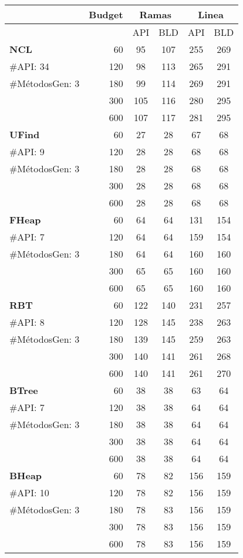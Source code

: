 \begin{table}[H]
{\scriptsize

\begin{tabular}{l |r |cc |cc }
\hline
&Budget&\multicolumn{2}{c|}{Ramas} &\multicolumn{2}{c|}{Linea} \\
\hline
   &   &API &BLD  &API &BLD   \\
\hline

\multirow{1}{*}{\textbf{NCL}}
& 60 & 95 & 107  & 255& 269  \\
{\scriptsize \#API: 34}& 120 & 98 & 113 & 265 &291 \\
{\scriptsize \#MétodosGen: 3}& 180 & 99& 114 & 269 & 291  \\
& 300 & 105 & 116  &280 & 295   \\
& 600 & 107 &  117 & 281&  295\\
\hline

\multirow{1}{*}{\textbf{UFind}} 
& 60 & 27 & 28  & 67& 68 \\
  {\scriptsize \#API: 9}& 120 & 28 & 28 & 68 &68 \\
  {\scriptsize \#MétodosGen: 3}& 180 & 28& 28 & 68 &68  \\
  & 300 & 28 & 28 &68 & 68  \\
& 600 & 28 &  28 & 68& 68 \\
\hline

\multirow{1}{*}{\textbf{FHeap}} 
 & 60  & 64 & 64&131 & 154  \\
  {\scriptsize \#API: 7}& 120 & 64 &64 & 159 & 154  \\
  {\scriptsize \#MétodosGen: 3}& 180 & 64 & 64  & 160 & 160 \\
  & 300 &  65& 65 & 160& 160  \\
& 600 & 65 & 65  &160 & 160 \\
 \hline

\multirow{1}{*}{\textbf{RBT}} 
 & 60 & 122 & 140  & 231 & 257 \\
  {\scriptsize \#API: 8}& 120 & 128 & 145  & 238 & 263 \\
  {\scriptsize \#MétodosGen: 3}& 180 & 139 & 145  & 259 & 263  \\
  & 300 & 140 & 141 &261 &   268\\
& 600 & 140 &  141 & 261& 270 \\
 \hline

\multirow{1}{*}{\textbf{BTree}} 
  & 60 & 38 & 38 & 63 & 64 \\
  {\scriptsize \#API: 7}& 120 & 38 & 38  & 64 & 64 \\
  {\scriptsize \#MétodosGen: 3}& 180 & 38 & 38 & 64 & 64  \\
    & 300 & 38 & 38 & 64 & 64    \\
& 600 & 38 & 38 & 64 & 64  \\
 \hline
\multirow{1}{*}{\textbf{BHeap}} 
  & 60 & 78 & 82& 156 &159 \\
  {\scriptsize \#API: 10}& 120& 78 & 82 & 156& 159  \\
  {\scriptsize \#MétodosGen: 3}&180 & 78 & 83 & 156 & 159 \\
  & 300 & 78 & 83 & 156 & 159  \\
  & 600 &  78 & 83 & 156 & 159 \\
 \hline


\end{tabular}}
\end{table}
